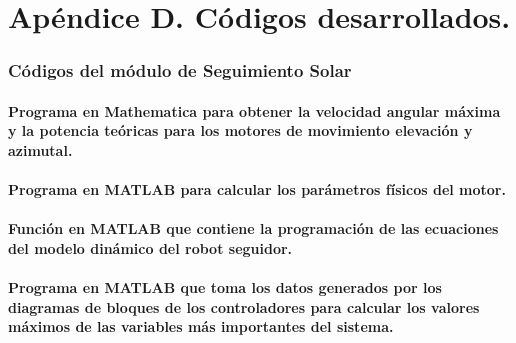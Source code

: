 \chapter{Apéndice D. Códigos desarrollados.}

\subsection{Códigos del módulo de Seguimiento Solar}

\subsubsection{Programa en Mathematica para obtener la velocidad angular máxima y la potencia teóricas para los motores de movimiento elevación y azimutal.}




%

\subsubsection{Programa en MATLAB para calcular los parámetros físicos del motor.}



\subsubsection{Función en MATLAB que contiene la programación de las ecuaciones del modelo dinámico del robot seguidor.}



\subsubsection{Programa en MATLAB que toma los datos generados por los diagramas de bloques de los controladores para calcular los valores máximos de las variables más importantes del sistema.}



